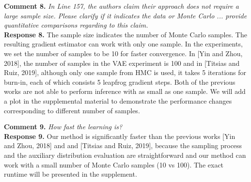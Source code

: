 \documentclass{article}
\begin{document}
\textbf{Comment 8.} \textit{In Line 157, the authors claim their approach does not require a large sample size. Please clarify if it indicates the data or Monte Carlo ... provide quantitative comparisons regarding to this claim.}\\
\textbf{Response 8.} The sample size indicates the number of Monte Carlo samples. The resulting gradient estimator can work with only one sample. In the experiments, we set the number of samples to be 10 for faster convergence. In [Yin and Zhou, 2018], the number of samples in the VAE experiment is 100 and in [Titsias and Ruiz, 2019], although only one sample from HMC is used, it takes 5 iterations for burn-in, each of which consists 5 leapfrog gradient steps. Both of the previous works are not able to perform inference with as small as one sample. We will add a plot in the supplemental material to demonstrate the performance changes corresponding to different number of samples.

\textbf{Comment 9.} \textit{How fast the learning is?}\\
\textbf{Response 9.} Our method is significantly faster than the previous works [Yin and Zhou, 2018] and and [Titsias and Ruiz, 2019], because the sampling process and the auxiliary distribution evaluation are straightforward and our method can work with a small number of Monte Carlo samples (10 vs 100). The exact runtime will be presented in the supplement.
\end{document}
